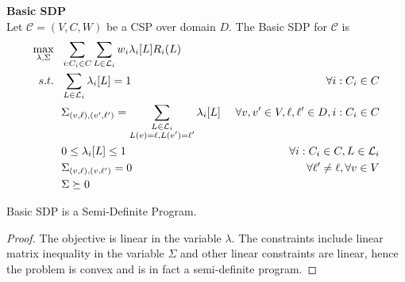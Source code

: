 \begin{definition}\textbf{Basic SDP} \\
Let $\mathcal{C} = (V,C,W)$ be a CSP over domain $D$. The Basic SDP for $\mathcal{C}$ is
\begin{alignat}{2}
\max_{\lambda, \Sigma} ~&~ \sum_{i : C_i \in C} \sum_{L \in \mathcal{L}_i}   w_i\lambda_i[L] R_i(L) & \\
s.t. ~ & ~ \sum_{L \in \mathcal{L}_i} \lambda_i[L] = 1  & \forall i : C_i \in C \label{eq:SDPlambdaSum} \\
     ~ & ~ \Sigma_{\left(v, \ell\right),\left(v', \ell'\right)} = \sum_{\substack {L\in \mathcal{L}_{i}\\ L(v) = \ell, L(v')=\ell'} }\lambda_{i}[L] &~\forall v,v' \in V, \ell,\ell' \in D, i : C_i \in C \label{eq:SDPtiePSD}\\
     ~ & ~ 0 \leq \lambda_i[L] \leq 1  & \forall  i : C_i \in C, L \in \mathcal{L}_i  \label{eq:SDPlambdaNonNeg} \\ 
     ~& ~ \Sigma_{\left(v, \ell\right),\left(v, \ell'\right)} = 0 & \forall \ell' \neq \ell,  \forall v \in V\\
     ~ & ~ \Sigma \succeq 0& \label{eq:SDPPSD}
\end{alignat}
\end{definition}

\begin{theorem}
Basic SDP is a Semi-Definite Program.
\end{theorem}
\begin{proof}
The objective is linear in the variable $\lambda$. The constraints include linear matrix inequality in the variable $\Sigma$ and other linear constraints are linear, hence the problem is convex and is in fact a semi-definite program.
\end{proof}


